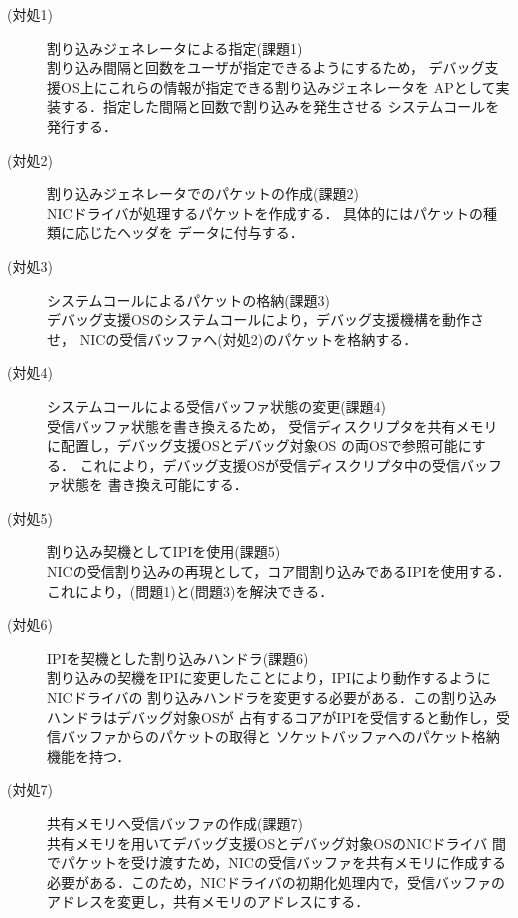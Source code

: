 \documentclass[submit,techreq,noauthor,dvipdfmx]{ipsj}
\begin{document}
\begin{description}
    \item[(対処1)] 割り込みジェネレータによる指定(課題1)\\
        割り込み間隔と回数をユーザが指定できるようにするため，
        デバッグ支援OS上にこれらの情報が指定できる割り込みジェネレータを
        APとして実装する．指定した間隔と回数で割り込みを発生させる
        システムコールを発行する．
    \item[(対処2)] 割り込みジェネレータでのパケットの作成(課題2)\\
        NICドライバが処理するパケットを作成する．
        具体的にはパケットの種類に応じたヘッダを
        データに付与する．
    \item[(対処3)] システムコールによるパケットの格納(課題3)\\
        デバッグ支援OSのシステムコールにより，デバッグ支援機構を動作させ，
        NICの受信バッファへ(対処2)のパケットを格納する．
    \item[(対処4)] システムコールによる受信バッファ状態の変更(課題4)\\
        受信バッファ状態を書き換えるため，
        受信ディスクリプタを共有メモリに配置し，デバッグ支援OSとデバッグ対象OS
        の両OSで参照可能にする．
        これにより，デバッグ支援OSが受信ディスクリプタ中の受信バッファ状態を
        書き換え可能にする．
    \item[(対処5)] 割り込み契機としてIPIを使用(課題5)\\
        NICの受信割り込みの再現として，コア間割り込みであるIPIを使用する．
        これにより，(問題1)と(問題3)を解決できる．
    \item[(対処6)] IPIを契機とした割り込みハンドラ(課題6)\\
        割り込みの契機をIPIに変更したことにより，IPIにより動作するようにNICドライバの
        割り込みハンドラを変更する必要がある．この割り込みハンドラはデバッグ対象OSが
        占有するコアがIPIを受信すると動作し，受信バッファからのパケットの取得と
        ソケットバッファへのパケット格納機能を持つ．
    \item[(対処7)] 共有メモリへ受信バッファの作成(課題7)\\
        共有メモリを用いてデバッグ支援OSとデバッグ対象OSのNICドライバ
        間でパケットを受け渡すため，NICの受信バッファを共有メモリに作成する
        必要がある．このため，NICドライバの初期化処理内で，受信バッファの
        アドレスを変更し，共有メモリのアドレスにする．
\end{description}
\end{document}
